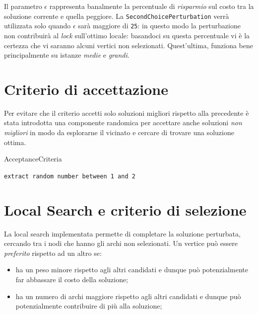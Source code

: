 \documentclass[11pt]{article}
\begin{document}
Il parametro $\epsilon$ rappresenta banalmente la percentuale di \textit{risparmio} sul costo tra la soluzione corrente e quella peggiore.
La \texttt{SecondChoicePerturbation} verrà utilizzata solo quando $\epsilon$ sarà maggiore di \verb|25|: in questo modo la perturbazione non contribuirà al \textit{lock} sull'ottimo locale: basandoci su questa percentuale vi è la certezza che vi saranno alcuni vertici non selezionati.
Quest'ultima, funziona bene principalmente su istanze \textit{medie} e \textit{grandi}.

\pagebreak


\section{Criterio di accettazione}

Per evitare che il criterio accetti solo soluzioni migliori rispetto alla precedente è stata introdotta una componente randomica per accettare anche soluzioni \textit{non migliori} in modo da esplorarne il vicinato e cercare di trovare una soluzione ottima.

\begin{algorithm}
    \caption{AcceptanceCriteria}
    \begin{algorithmic}
    \State{}
        \State{}
    \EndIf{}
    \State\texttt{extract random number between 1 and 2}
    \State{}
        \State{}
    \EndIf{}
    \State{}
\end{algorithmic}
\end{algorithm}


\section{Local Search e criterio di selezione}

La local search implementata permette di completare la soluzione perturbata, cercando tra i nodi che hanno gli archi non selezionati.
Un vertice può essere \textit{preferito} rispetto ad un altro se:

\begin{itemize}
    \item{ha un peso minore rispetto agli altri candidati e dunque può potenzialmente far abbassare il costo della soluzione;}
    \item{ha un numero di archi maggiore rispetto agli altri candidati e dunque può potenzialmente contribuire di più alla soluzione;}
\end{itemize}
\end{document}
